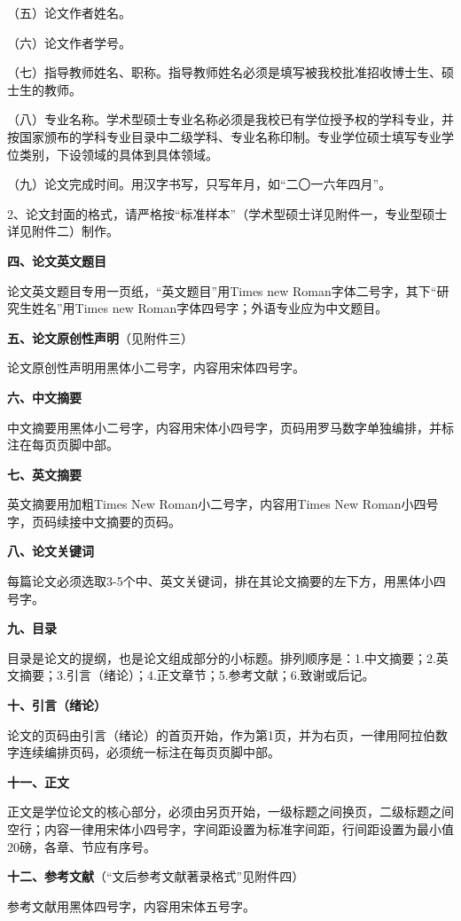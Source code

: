\documentclass{WHUMaster}   %
\begin{document}
（五）论文作者姓名。

（六）论文作者学号。

（七）指导教师姓名、职称。指导教师姓名必须是填写被我校批准招收博士生、硕士生的教师。

（八）专业名称。学术型硕士专业名称必须是我校已有学位授予权的学科专业，并按国家颁布的学科专业目录中二级学科、专业名称印制。专业学位硕士填写专业学位类别，下设领域的具体到具体领域。

（九）论文完成时间。用汉字书写，只写年月，如“二〇一六年四月”。

2、论文封面的格式，请严格按“标准样本”（学术型硕士详见附件一，专业型硕士详见附件二）制作。

\textbf{四、论文英文题目}

论文英文题目专用一页纸，“英文题目”用Times new Roman字体二号字，其下“研究生姓名”用Times new Roman字体四号字；外语专业应为中文题目。

\textbf{五、论文原创性声明}（见附件三）

论文原创性声明用黑体小二号字，内容用宋体四号字。

\textbf{六、中文摘要}

中文摘要用黑体小二号字，内容用宋体小四号字，页码用罗马数字单独编排，并标注在每页页脚中部。

\textbf{七、英文摘要}

英文摘要用加粗Times New Roman小二号字，内容用Times New Roman小四号字，页码续接中文摘要的页码。

\textbf{八、论文关键词}

每篇论文必须选取3-5个中、英文关键词，排在其论文摘要的左下方，用黑体小四号字。

\textbf{九、目录}

目录是论文的提纲，也是论文组成部分的小标题。排列顺序是：1.中文摘要；2.英文摘要；3.引言（绪论）；4.正文章节；5.参考文献；6.致谢或后记。

\textbf{十、引言（绪论）}

论文的页码由引言（绪论）的首页开始，作为第1页，并为右页，一律用阿拉伯数字连续编排页码，必须统一标注在每页页脚中部。

\textbf{十一、正文}

正文是学位论文的核心部分，必须由另页开始，一级标题之间换页，二级标题之间空行；内容一律用宋体小四号字，字间距设置为标准字间距，行间距设置为最小值20磅，各章、节应有序号。

\textbf{十二、参考文献}（“文后参考文献著录格式”见附件四）

参考文献用黑体四号字，内容用宋体五号字。
\end{document}
